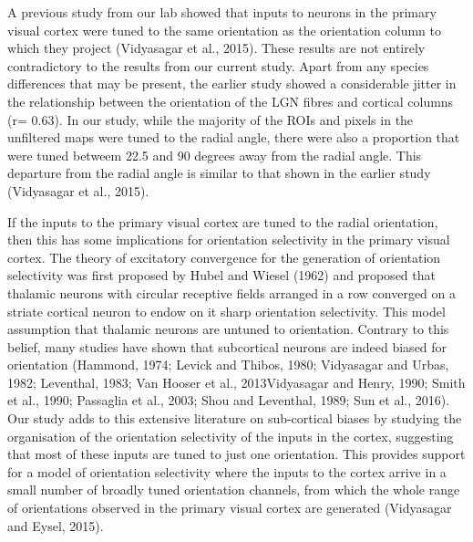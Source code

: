 		A previous study from our lab showed that inputs to neurons in the primary visual cortex were tuned to the same orientation as the orientation column to which they project (Vidyasagar et al., 2015). These results are not entirely contradictory to the results from our current study. Apart from any species differences that may be present, the earlier study showed a considerable jitter in the relationship between the orientation of the LGN fibres and cortical columns (r= 0.63). In our study, while the majority of the ROIs and pixels  in the unfiltered maps were tuned to the radial angle, there were also a proportion that were tuned betweem 22.5 and 90 degrees away from the radial angle. This departure from the radial angle is similar to that shown in the earlier study (Vidyasagar et al., 2015). 
		
		If the inputs to the primary visual cortex are tuned to the radial orientation, then this has some implications for orientation selectivity in the primary visual cortex. The theory of excitatory convergence for the generation of orientation selectivity was first proposed by Hubel and Wiesel (1962) and proposed that thalamic neurons with circular receptive fields arranged in a row converged on a striate cortical neuron to endow on it sharp orientation selectivity. This model assumption that thalamic neurons are untuned to orientation. Contrary to this belief, many studies have shown that subcortical neurons are indeed biased for orientation (Hammond, 1974; Levick and Thibos, 1980; Vidyasagar and Urbas, 1982; Leventhal, 1983; Van Hooser et al., 2013Vidyasagar and Henry, 1990; Smith et al., 1990; Passaglia et al., 2003; Shou and Leventhal, 1989; Sun et al., 2016). Our study adds to this extensive literature on sub-cortical biases by studying the organisation of the orientation selectivity of the inputs in the cortex, suggesting that most of these inputs are tuned to just one orientation. This provides support for a model of orientation selectivity where the inputs to the cortex arrive in a small number of broadly tuned orientation channels, from which the whole range of orientations observed in the primary visual cortex are generated (Vidyasagar and Eysel, 2015).
		
